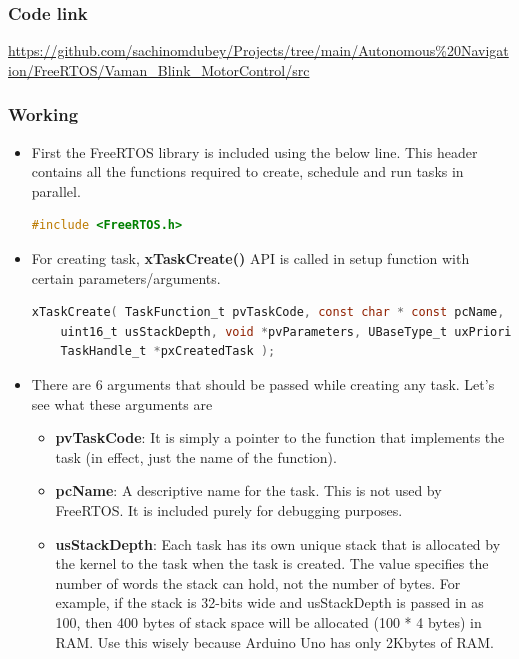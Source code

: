 \subsubsection{Code link} \label{Code_link_FreeRTOS_Vaman}
\begin{tcolorbox}
\url{https://github.com/sachinomdubey/Projects/tree/main/Autonomous\%20Navigation/FreeRTOS/Vaman_Blink_MotorControl/src}
\end{tcolorbox}

\subsubsection{Working}
\begin{itemize}
    \item First the FreeRTOS library is included using the below line. This header contains all the functions required to create, schedule and run tasks in parallel.
    \begin{lstlisting}[language=C]
    #include <FreeRTOS.h>
    \end{lstlisting}
    \item For creating task, \textbf{xTaskCreate()} API is called in setup function with certain parameters/arguments.
    \begin{lstlisting}[language=C]
    xTaskCreate( TaskFunction_t pvTaskCode, const char * const pcName,
    uint16_t usStackDepth, void *pvParameters, UBaseType_t uxPriority,
    TaskHandle_t *pxCreatedTask );
    \end{lstlisting}
    \item There are 6 arguments that should be passed while creating any task. Let’s see what these arguments are
    \begin{itemize}
        \item \textbf{pvTaskCode}: It is simply a pointer to the function that implements the task (in effect, just the name of the function).
        \item \textbf{pcName}: A descriptive name for the task. This is not used by FreeRTOS. It is included purely for debugging purposes.
        \item \textbf{usStackDepth}: Each task has its own unique stack that is allocated by the kernel to the task when the task is created. The value specifies the number of words the stack can hold, not the number of bytes. For example, if the stack is 32-bits wide and usStackDepth is passed in as 100, then 400 bytes of stack space will be allocated (100 * 4 bytes) in RAM. Use this wisely because Arduino Uno has only 2Kbytes of RAM.

\end{itemize}
\end{itemize}
